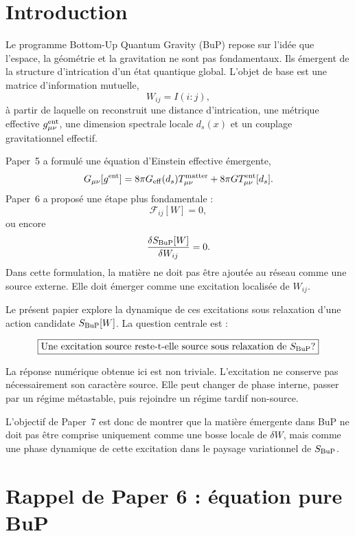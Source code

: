 \documentclass[11pt,a4paper]{article}
\begin{document}
\tableofcontents

\section{Introduction}

Le programme Bottom-Up Quantum Gravity (BuP) repose sur l'idée que l'espace, la
géométrie et la gravitation ne sont pas fondamentaux. Ils émergent de la structure
d'intrication d'un état quantique global. L'objet de base est une matrice
d'information mutuelle,
\[
W_{ij}=I(i:j),
\]
à partir de laquelle on reconstruit une distance d'intrication, une métrique
effective \(g_{\mu\nu}^{\rm ent}\), une dimension spectrale locale \(d_s(x)\) et
un couplage gravitationnel effectif.

Paper~5 a formulé une équation d'Einstein effective émergente,
\[
G_{\mu\nu}[g^{\rm ent}]
=
8\pi G_{\rm eff}(d_s)T_{\mu\nu}^{\rm matter}
+
8\pi G T_{\mu\nu}^{\rm ent}[d_s].
\]
Paper~6 a proposé une étape plus fondamentale :
\[
\mathcal{F}_{ij}[W]=0,
\]
ou encore
\[
\frac{\delta S_{\rm BuP}[W]}{\delta W_{ij}}=0.
\]
Dans cette formulation, la matière ne doit pas être ajoutée au réseau comme une
source externe. Elle doit émerger comme une excitation localisée de \(W_{ij}\).

Le présent papier explore la dynamique de ces excitations sous relaxation d'une
action candidate \(S_{\rm BuP}[W]\). La question centrale est :

\[
\boxed{
\text{Une excitation source reste-t-elle source sous relaxation de }S_{\rm BuP} ?
}
\]

La réponse numérique obtenue ici est non triviale. L'excitation ne conserve pas
nécessairement son caractère source. Elle peut changer de phase interne,
passer par un régime métastable, puis rejoindre un régime tardif non-source.

L'objectif de Paper~7 est donc de montrer que la matière émergente dans BuP ne
doit pas être comprise uniquement comme une bosse locale de \(\delta W\), mais
comme une phase dynamique de cette excitation dans le paysage variationnel de
\(S_{\rm BuP}\).

\section{Rappel de Paper 6 : équation pure BuP}
\end{document}
